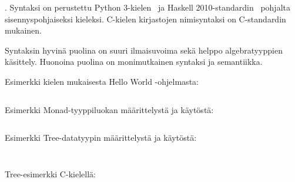 
\bnfdescription.
Syntaksi on perustettu
Python 3-kielen~\citep{pythonsyntax} ja Haskell
2010-standardin~\citep{haskellsyntax} pohjalta sisennyspohjaiseksi kieleksi.
C-kielen kirjastojen nimisyntaksi on C-standardin~\citep{C11} mukainen.

Syntaksin hyvinä puolina on suuri ilmaisuvoima sekä helppo algebratyyppien
käsittely. Huonoina puolina on monimutkainen syntaksi ja semantiikka.

 \newpage
{} \newpage
{}

Esimerkki kielen mukaisesta Hello World -ohjelmasta:

\def\mylexer{kieli_lexer.py:KieliLexer -x}
\inputminted{\mylexer}{example.kieli}

Esimerkki Monad-tyyppiluokan määrittelystä ja käytöstä:

\inputminted{\mylexer}{monad.kieli}

\newpage

Esimerkki Tree-datatyypin määrittelystä ja käytöstä:

\inputminted{\mylexer}{tree.kieli}
\inputminted{text}{tree-output}
\newpage

Tree-esimerkki C-kielellä:

\inputminted{C}{tree.c}
